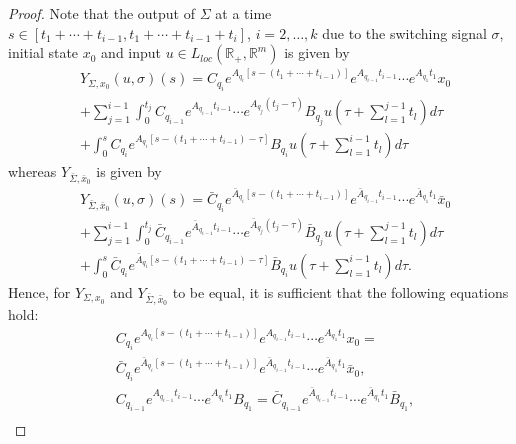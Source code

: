 \documentclass[journal]{IEEEtran}
\begin{document}
\begin{proof}
Note that the output of $\Sigma$ at a time $s \in [t_1+\cdots+t_{i-1}, t_1+\cdots+t_{i-1}+t_i]$, $i=2, \dots, k$ due to the switching signal $\sigma$, initial state $x_0$ and input $u \in L_{loc}(\mathbb{R}_+,\mathbb{R}^m) $ is given by
	\begin{equation} \label{eq:output_pf_thm9}
		\begin{aligned}
			& Y_{\Sigma,x_0}(u,\sigma)(s) =  C_{q_i}e^{A_{q_i}[s-(t_1+\cdots+t_{i-1})]}e^{ A_{q_{i-1}}t_{i-1} } \cdots e^{A_{q_1}t_1}x_0 \\
			& + \sum_{j=1}^{i-1} \int_{0}^{t_j}C_{q_{i-1}} e^{A_{q_{i-1}}t_{i-1}} \cdots e^{A_{q_j}(t_j-\tau)}B_{q_j} u \left( \tau + \sum_{l=1}^{j-1} t_l \right)d\tau \\
			& + \int_{0}^{s}C_{q_i} e^{A_{q_i}[s-(t_1+\cdots+t_{i-1})-\tau]}B_{q_i} u \left( \tau + \sum_{l=1}^{i-1} t_l \right)d\tau
		\end{aligned}
	\end{equation}
	whereas $Y_{\bar{\Sigma},\bar{x}_0}$ is given by
	\begin{equation} \label{eq:output_pf_thm9_2}
		\begin{aligned}
			& Y_{\bar{\Sigma},\bar{x}_0} (u,\sigma)(s) =  \bar{C}_{q_i}e^{\bar{A}_{q_i}[s-(t_1+\cdots+t_{i-1})]}e^{ \bar{A}_{q_{i-1}}t_{i-1} } \cdots e^{\bar{A}_{q_1}t_1}\bar{x}_0 \\
			& + \sum_{j=1}^{i-1} \int_{0}^{t_j}\bar{C}_{q_{i-1}} e^{\bar{A}_{q_{i-1}}t_{i-1}} \cdots e^{\bar{A}_{q_j}(t_j-\tau)}\bar{B}_{q_j} u \left( \tau + \sum_{l=1}^{j-1} t_l \right)d \tau \\
			& + \int_{0}^{s}\bar{C}_{q_i} e^{\bar{A}_{q_i}[s-(t_1+\cdots+t_{i-1})-\tau]}\bar{B}_{q_i} u \left( \tau + \sum_{l=1}^{i-1} t_l \right)d \tau.
		\end{aligned}
	\end{equation}
	Hence, for $Y_{\Sigma,x_0}$ and $Y_{\bar{\Sigma},\bar{x}_0}$ to be equal, it is sufficient that the following equations hold:
	\begin{equation} \label{eq:pf_thm9_state_trans}
		\begin{aligned}
			 & C_{q_i} e^{A_{q_i}[s-(t_1+\cdots+t_{i-1})]} e^{ A_{q_{i-1}}t_{i-1} }   \cdots e^{A_{q_1}t_1}x_0  = \\ 
			 & \bar{C}_{q_i}e^{\bar{A}_{q_i}[s-(t_1+\cdots+t_{i-1})]}e^{ \bar{A}_{q_{i-1}}t_{i-1} } \cdots e^{\bar{A}_{q_1}t_1}\bar{x}_0, \\
			& C_{q_{i-1}}e^{A_{q_{i-1}}t_{i-1}} \cdots e^{A_{q_1}t_1}B_{q_1} = \bar{C}_{q_{i-1}}e^{\bar{A}_{q_{i-1}}t_{i-1}} \cdots e^{\bar{A}_{q_1}t_1}\bar{B}_{q_1}, \\

\end{aligned}
\end{equation}
\end{proof}
\end{document}

